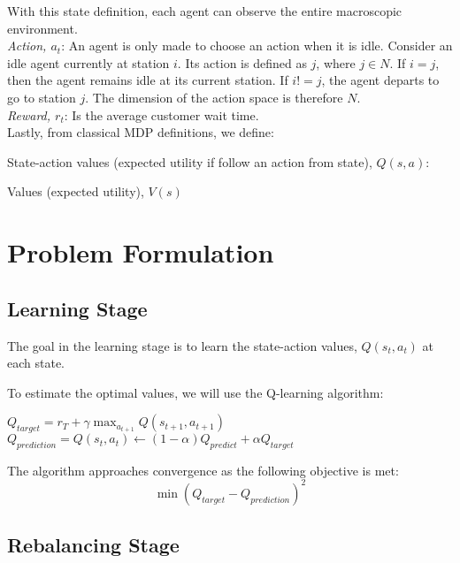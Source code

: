 \documentclass{article}
\begin{document}
With this state definition, each agent can observe the entire macroscopic environment.\\

\noindent \textit{Action, $a_t$}: An agent is only made to choose an action when it is idle. Consider an idle agent currently at station $i$. Its action is defined as $j$, where $j\in N$. If $i = j$, then the agent remains idle at its current station. If $i != j$, the agent departs to go to station $j$. The dimension of the action space is therefore $N$. \\

\noindent \textit{Reward, $r_t$}: Is the average customer wait time. \\ 

\noindent Lastly, from classical MDP definitions, we define:

State-action values (expected utility if follow an action from state), $Q(s,a)$: 

Values (expected utility), $ V(s)$  

\section{Problem Formulation }
\subsection{Learning Stage}
The goal in the learning stage is to learn the state-action values, $Q(s_t,a_t)$ at each state.

To estimate the optimal values, we will use the Q-learning algorithm:
\begin{algorithmic}
    \State $Q_{target} = r_T+\gamma \max_{a_{t+1}} Q(s_{t+1},a_{t+1})$
    \State $Q_{prediction} = Q(s_t,a_t) \leftarrow (1-\alpha)Q_{predict}+\alpha Q_{target}$
\EndFor\\
\end{algorithmic}

The algorithm approaches convergence as the following objective is met:
\begin{equation}
        \min (Q_{target} - Q_{prediction})^2
\end{equation}

\subsection{Rebalancing Stage}
\end{document}
